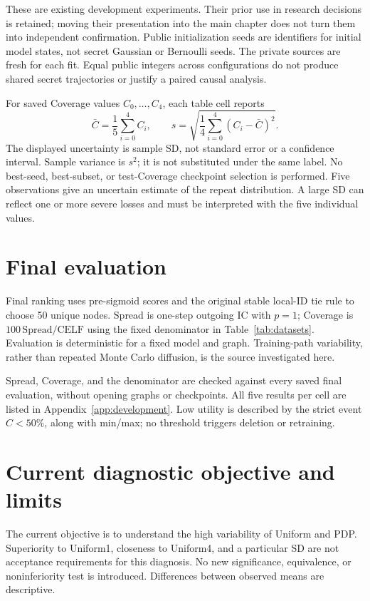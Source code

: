 These are existing development experiments. Their prior use in research decisions is retained; moving their presentation into the main chapter does not turn them into independent confirmation. Public initialization seeds are identifiers for initial model states, not secret Gaussian or Bernoulli seeds. The private sources are fresh for each fit. Equal public integers across configurations do not produce shared secret trajectories or justify a paired causal analysis.

For saved Coverage values $C_0,\ldots,C_4$, each table cell reports
\begin{equation}
 \bar C=\frac{1}{5}\sum_{i=0}^{4}C_i,\qquad
 s=\sqrt{\frac{1}{4}\sum_{i=0}^{4}(C_i-\bar C)^2}.\label{eq:fiveseed}
\end{equation}
The displayed uncertainty is sample SD, not standard error or a confidence interval. Sample variance is $s^2$; it is not substituted under the same label. No best-seed, best-subset, or test-Coverage checkpoint selection is performed. Five observations give an uncertain estimate of the repeat distribution. A large SD can reflect one or more severe losses and must be interpreted with the five individual values.

\section{Final evaluation}
Final ranking uses pre-sigmoid scores and the original stable local-ID tie rule to choose 50 unique nodes. Spread is one-step outgoing IC with $p=1$; Coverage is $100\,\mathrm{Spread}/\mathrm{CELF}$ using the fixed denominator in Table~\ref{tab:datasets}. Evaluation is deterministic for a fixed model and graph. Training-path variability, rather than repeated Monte Carlo diffusion, is the source investigated here.

Spread, Coverage, and the denominator are checked against every saved final evaluation, without opening graphs or checkpoints. All five results per cell are listed in Appendix~\ref{app:development}. Low utility is described by the strict event $C<50\%$, along with min/max; no threshold triggers deletion or retraining.

\section{Current diagnostic objective and limits}
The current objective is to understand the high variability of Uniform and PDP. Superiority to Uniform1, closeness to Uniform4, and a particular SD are not acceptance requirements for this diagnosis. No new significance, equivalence, or noninferiority test is introduced. Differences between observed means are descriptive.

